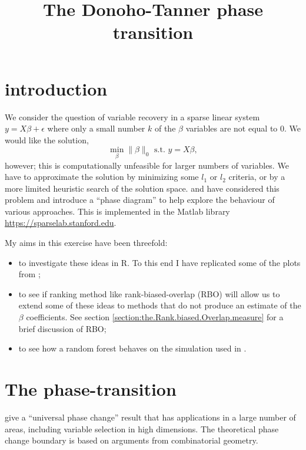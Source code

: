 \documentclass[11pt]{article}
\title{The Donoho-Tanner phase transition}
\author{}
\date{}
\begin{document}
\maketitle




\section{introduction}
We consider the question of variable recovery in a sparse linear system $y=X \beta + \epsilon$ where only
a small number $k$ of the $\beta$ variables are not equal to 0. We would like the solution,
\[
\min_\beta \rVert \beta \rVert_0 \textrm{ s.t. } y = X\beta,
\]
however; this is computationally unfeasible for larger numbers of variables. We have to approximate the solution by
minimizing some $l_1$ or $l_2$ criteria, or by a more limited heuristic search of the solution space.
\cite{Donoho.and.Tanner.2009} and \cite{Donoho.and.Stodden.2006}  have considered this problem and introduce a ``phase
diagram'' to help explore the behaviour of various approaches.
This is implemented in the Matlab library \url{https://sparselab.stanford.edu}.

My aims in this exercise have been threefold:
\begin{itemize}
\item to investigate these ideas  in R. To this end I have replicated some of the plots from
  \cite{Donoho.and.Stodden.2006};
\item to see if ranking method like rank-biased-overlap (RBO) \cite{Webber2010} will allow us to extend some of these
  ideas to methods that do not produce an estimate of the $\beta$ coefficients. See section \ref{section:the.Rank.biased.Overlap.measure} for a brief
  discussion of RBO;
\item to see how a random forest behaves on the simulation used in \cite{Donoho.and.Stodden.2006}.
\end{itemize}

\section{The phase-transition}
\cite{Donoho.and.Tanner.2009} give a ``universal phase change'' result that has applications in a
large number of areas, including variable selection in high dimensions. The theoretical phase change boundary is based on arguments
from combinatorial geometry.
\end{document}

